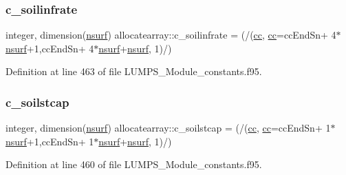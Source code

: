 \mbox{\label{namespaceallocatearray_a3405541f33797c10f2aaa4a78c66cc80}} 
\subsubsection{\texorpdfstring{c\+\_\+soilinfrate}{c\_soilinfrate}}
{\footnotesize\ttfamily integer, dimension(\hyperlink{namespaceallocatearray_acd22f92a06f7e9a2a91426b3dc99fdb0}{nsurf}) allocatearray\+::c\+\_\+soilinfrate = (/(\hyperlink{namespaceallocatearray_ac863c81704eb507dee10f5e10741e10c}{cc}, \hyperlink{namespaceallocatearray_ac863c81704eb507dee10f5e10741e10c}{cc}=cc\+End\+Sn+ 4$\ast$\hyperlink{namespaceallocatearray_acd22f92a06f7e9a2a91426b3dc99fdb0}{nsurf}+1,cc\+End\+Sn+ 4$\ast$\hyperlink{namespaceallocatearray_acd22f92a06f7e9a2a91426b3dc99fdb0}{nsurf}+\hyperlink{namespaceallocatearray_acd22f92a06f7e9a2a91426b3dc99fdb0}{nsurf}, 1)/)}



Definition at line 463 of file L\+U\+M\+P\+S\+\_\+\+Module\+\_\+constants.\+f95.

\mbox{\label{namespaceallocatearray_a29f130b20ba3693a1f9e7340d53a96c2}} 
\subsubsection{\texorpdfstring{c\+\_\+soilstcap}{c\_soilstcap}}
{\footnotesize\ttfamily integer, dimension(\hyperlink{namespaceallocatearray_acd22f92a06f7e9a2a91426b3dc99fdb0}{nsurf}) allocatearray\+::c\+\_\+soilstcap = (/(\hyperlink{namespaceallocatearray_ac863c81704eb507dee10f5e10741e10c}{cc}, \hyperlink{namespaceallocatearray_ac863c81704eb507dee10f5e10741e10c}{cc}=cc\+End\+Sn+ 1$\ast$\hyperlink{namespaceallocatearray_acd22f92a06f7e9a2a91426b3dc99fdb0}{nsurf}+1,cc\+End\+Sn+ 1$\ast$\hyperlink{namespaceallocatearray_acd22f92a06f7e9a2a91426b3dc99fdb0}{nsurf}+\hyperlink{namespaceallocatearray_acd22f92a06f7e9a2a91426b3dc99fdb0}{nsurf}, 1)/)}



Definition at line 460 of file L\+U\+M\+P\+S\+\_\+\+Module\+\_\+constants.\+f95.

